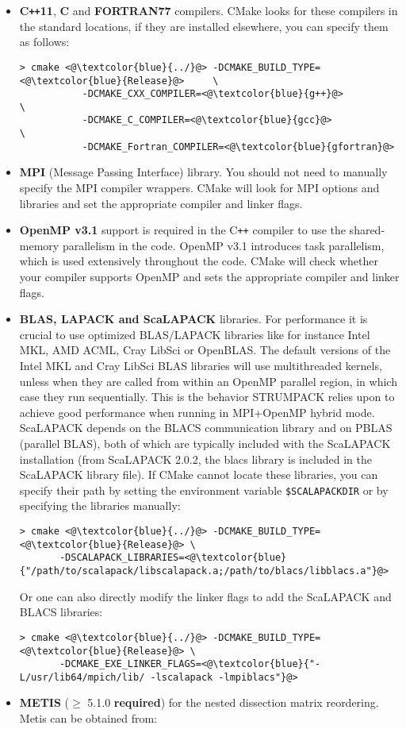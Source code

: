 \documentclass{article}
\newcommand{\tm}{\textsuperscript{\textregistered}}
\begin{document}
\begin{itemize}
\item \textbf{C\texttt{++}11}, \textbf{C} and \textbf{FORTRAN77}
  compilers. CMake looks for these compilers in the standard
  locations, if they are installed elsewhere, you can specify them as
  follows:
  \begin{lstlisting}[style=Bash]
    > cmake <@\textcolor{blue}{../}@> -DCMAKE_BUILD_TYPE=<@\textcolor{blue}{Release}@>     \
           -DCMAKE_CXX_COMPILER=<@\textcolor{blue}{g++}@>            \
           -DCMAKE_C_COMPILER=<@\textcolor{blue}{gcc}@>              \
           -DCMAKE_Fortran_COMPILER=<@\textcolor{blue}{gfortran}@>
  \end{lstlisting}
\item \textbf{MPI} (Message Passing Interface) library.  You should
  not need to manually specify the MPI compiler wrappers.  CMake will
  look for MPI options and libraries and set the appropriate compiler
  and linker flags.
\item \textbf{OpenMP v3.1} support is required in the C\texttt{++}
  compiler to use the shared-memory parallelism in the code. OpenMP
  v3.1 introduces task parallelism, which is used extensively
  throughout the code. CMake will check whether your compiler supports
  OpenMP and sets the appropriate compiler and linker flags.
\item \textbf{BLAS, LAPACK and ScaLAPACK} libraries. For performance
  it is crucial to use optimized BLAS/LAPACK libraries like for
  instance Intel\tm{} MKL, AMD\tm{} ACML, Cray\tm{} LibSci or
  OpenBLAS. The default versions of the Intel\tm{} MKL and Cray\tm{}
  LibSci BLAS libraries will use multithreaded kernels, unless when
  they are called from within an OpenMP parallel region, in which case
  they run sequentially. This is the behavior STRUMPACK relies upon to
  achieve good performance when running in MPI+OpenMP hybrid
  mode. ScaLAPACK depends on the BLACS communication library and on
  PBLAS (parallel BLAS), both of which are typically included with the
  ScaLAPACK installation (from ScaLAPACK 2.0.2, the blacs library is
  included in the ScaLAPACK library file). If CMake cannot locate
  these libraries, you can specify their path by setting the
  environment variable
  \lstinline[style=Bash]!$SCALAPACKDIR! or by specifying the libraries
  manually:
  \begin{lstlisting}[style=Bash]
    > cmake <@\textcolor{blue}{../}@> -DCMAKE_BUILD_TYPE=<@\textcolor{blue}{Release}@> \
       -DSCALAPACK_LIBRARIES=<@\textcolor{blue}{"/path/to/scalapack/libscalapack.a;/path/to/blacs/libblacs.a"}@>
  \end{lstlisting}
  Or one can also directly modify the linker flags to add the
  ScaLAPACK and BLACS libraries:
  \begin{lstlisting}[style=Bash]
    > cmake <@\textcolor{blue}{../}@> -DCMAKE_BUILD_TYPE=<@\textcolor{blue}{Release}@> \
       -DCMAKE_EXE_LINKER_FLAGS=<@\textcolor{blue}{"-L/usr/lib64/mpich/lib/ -lscalapack -lmpiblacs"}@>
  \end{lstlisting}
\item \textbf{METIS}
  ($\geq$ 5.1.0 \textbf{required}) for the nested dissection matrix
  reordering. Metis can be obtained from:


\end{itemize}
\end{document}
